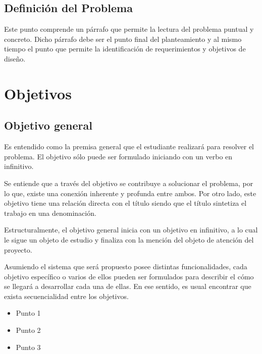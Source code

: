 \subsection{Definición del Problema}
Este punto comprende un párrafo que permite la lectura del problema puntual y concreto. Dicho párrafo debe ser el punto final del planteamiento y al mismo tiempo el punto que permite la identificación de requerimientos y objetivos de diseño. 

\section{Objetivos}
\subsection{Objetivo general}
Es entendido como la premisa general que el estudiante realizará para resolver el problema. El objetivo sólo puede ser formulado iniciando con un verbo en infinitivo.

Se entiende que a través del objetivo se contribuye a solucionar el problema, por lo que, existe una conexión inherente y profunda entre ambos. Por otro lado, este objetivo tiene una relación directa con el título siendo que el título sintetiza el trabajo en una denominación. 

Estructuralmente, el objetivo general inicia con un objetivo en infinitivo, a lo cual le sigue un objeto de estudio y finaliza con la mención del objeto de atención del proyecto.

Asumiendo el sistema que será propuesto posee distintas funcionalidades, cada objetivo específico o varios de ellos pueden ser formulados para describir el cómo se llegará a desarrollar cada una de ellas. En ese sentido, es usual encontrar que exista secuencialidad entre los objetivos.

\begin{itemize}
	\item Punto 1
	\item Punto 2
	\item Punto 3
\end{itemize}
